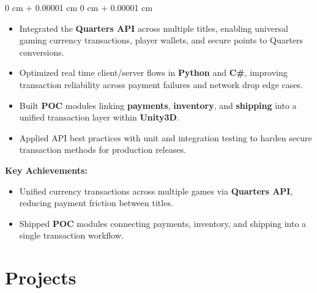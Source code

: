 \documentclass[10pt, letterpaper]{article}
\newenvironment{highlights}{
    \begin{itemize}[
        topsep=0.10 cm,
        parsep=0.10 cm,
        partopsep=0pt,
        itemsep=0pt,
        leftmargin=0 cm + 10pt
    ]
}{
    \end{itemize}
} %
\newenvironment{highlightsforbulletentries}{
    \begin{itemize}[
        topsep=0.10 cm,
        parsep=0.10 cm,
        partopsep=0pt,
        itemsep=0pt,
        leftmargin=10pt
    ]
}{
    \end{itemize}
} %
\newenvironment{onecolentry}{
    \begin{adjustwidth}{
        0 cm + 0.00001 cm
    }{
        0 cm + 0.00001 cm
    }
}{
    \end{adjustwidth}
} %
\begin{document}
\begin{onecolentry}
\begin{highlights}
	\item Integrated the \textbf{Quarters API} across multiple titles, enabling universal gaming currency transactions, player wallets, and secure points to Quarters conversions.
	\item Optimized real time client/server flows in \textbf{Python} and \textbf{C\#}, improving transaction reliability across payment failures and network drop edge cases.
	\item Built \textbf{POC} modules linking \textbf{payments}, \textbf{inventory}, and \textbf{shipping} into a unified transaction layer within \textbf{Unity3D}.
	\item Applied API best practices with unit and integration testing to harden secure transaction methods for production releases.
\end{highlights}

\textbf{Key Achievements:}
\begin{highlightsforbulletentries}
	\item Unified currency transactions across multiple games via \textbf{Quarters API}, reducing payment friction between titles.
	\item Shipped \textbf{POC} modules connecting payments, inventory, and shipping into a single transaction workflow.
\end{highlightsforbulletentries}
\end{onecolentry}




\vspace{0.2 cm}


\section{Projects}
\vspace{0.05 cm}
\end{document}
